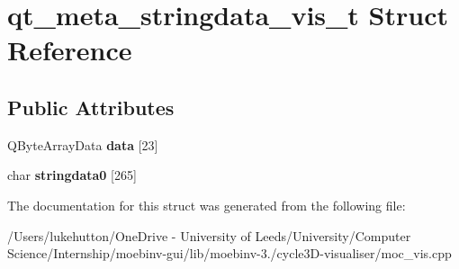 \hypertarget{structqt__meta__stringdata__vis__t}{}\section{qt\+\_\+meta\+\_\+stringdata\+\_\+vis\+\_\+t Struct Reference}
\label{structqt__meta__stringdata__vis__t}
\subsection*{Public Attributes}
\begin{DoxyCompactItemize}
\item 
\mbox{\label{structqt__meta__stringdata__vis__t_afc7b1b2d419c6171c8ee28aa4a3c6734}} 
Q\+Byte\+Array\+Data {\bfseries data} \mbox{[}23\mbox{]}
\item 
\mbox{\label{structqt__meta__stringdata__vis__t_a9cfb4fa554a9f2369e7ca87729f4e76e}} 
char {\bfseries stringdata0} \mbox{[}265\mbox{]}
\end{DoxyCompactItemize}


The documentation for this struct was generated from the following file\+:\begin{DoxyCompactItemize}
\item 
/\+Users/lukehutton/\+One\+Drive -\/ University of Leeds/\+University/\+Computer Science/\+Internship/moebinv-\/gui/lib/moebinv-\/3./cycle3\+D-\/visualiser/moc\+\_\+vis.\+cpp\end{DoxyCompactItemize}
